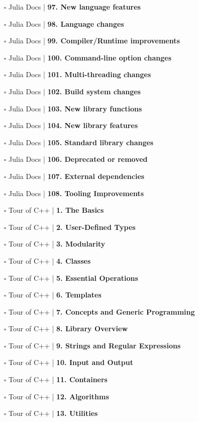 \documentclass[a4, landscape, 12pt]{article}
\newcommand{\checkbox}{$\square$}%
\begin{document}
\begin{itemize}
{}
\item [\checkbox]  Julia Docs | \textbf{ 97. New language features
}
\item [\checkbox]  Julia Docs | \textbf{ 98. Language changes
}
\item [\checkbox]  Julia Docs | \textbf{ 99. Compiler/Runtime improvements
}
\item [\checkbox]  Julia Docs | \textbf{ 100. Command-line option changes
}
\item [\checkbox]  Julia Docs | \textbf{ 101. Multi-threading changes
}
\item [\checkbox]  Julia Docs | \textbf{ 102. Build system changes
}
\item [\checkbox]  Julia Docs | \textbf{ 103. New library functions
}
\item [\checkbox]  Julia Docs | \textbf{ 104. New library features
}
\item [\checkbox]  Julia Docs | \textbf{ 105. Standard library changes
}
\item [\checkbox]  Julia Docs | \textbf{ 106. Deprecated or removed
}
\item [\checkbox]  Julia Docs | \textbf{ 107. External dependencies
}
\item [\checkbox]  Julia Docs | \textbf{ 108. Tooling Improvements
}
\item [\checkbox]  Tour of C++ | \textbf{ 1. The Basics
}
\item [\checkbox]  Tour of C++ | \textbf{ 2. User-Defined Types
}
\item [\checkbox]  Tour of C++ | \textbf{ 3. Modularity
}
\item [\checkbox]  Tour of C++ | \textbf{ 4. Classes
}
\item [\checkbox]  Tour of C++ | \textbf{ 5. Essential Operations
}
\item [\checkbox]  Tour of C++ | \textbf{ 6. Templates
}
\item [\checkbox]  Tour of C++ | \textbf{ 7. Concepts and Generic Programming
}
\item [\checkbox]  Tour of C++ | \textbf{ 8. Library Overview
}
\item [\checkbox]  Tour of C++ | \textbf{ 9. Strings and Regular Expressions
}
\item [\checkbox]  Tour of C++ | \textbf{ 10. Input and Output
}
\item [\checkbox]  Tour of C++ | \textbf{ 11. Containers
}
\item [\checkbox]  Tour of C++ | \textbf{ 12. Algorithms
}
\item [\checkbox]  Tour of C++ | \textbf{ 13. Utilities
}
\end{itemize}
\end{document}
